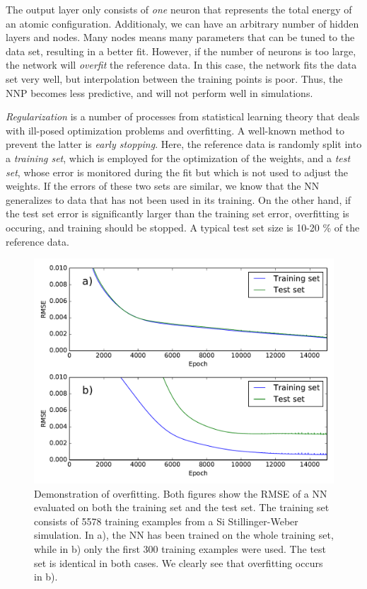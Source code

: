 \documentclass[twoside,english]{uiofysmaster}
\begin{document}
The output layer only consists of \textit{one} neuron that represents the total energy of an atomic 
configuration. Additionaly, we can have an arbitrary number of hidden layers and nodes. 
Many nodes means many parameters that can be tuned to the data set, resulting in a better fit.
However, if the number of neurons is too large, the network will \textit{overfit} the reference data. 
In this case, the network fits the data set very well, but interpolation between the training points is poor. Thus, 
the NNP becomes less predictive, and will not perform well in simulations.

\textit{Regularization} is a number of processes from statistical learning theory that deals with ill-posed optimization
problems and overfitting. A well-known method to prevent the latter is \textit{early stopping}. 
Here, the reference data is randomly split into 
a \textit{training set}, which is employed for the optimization of the weights, and a \textit{test set}, whose error is monitored
during the fit but which is not used to adjust the weights. If the errors of these two sets are similar, we know that the NN
generalizes to data that has not been used in its training. On the other hand, if the test set error is significantly larger
than the training set error, overfitting is occuring, and training should be stopped. 
A typical test set size is 10-20 \% of the reference data. 
\begin{figure}
\centering
  \includegraphics[width = 0.8\linewidth]{Figures/Implementation/overfitting.pdf}
  \caption{Demonstration of overfitting. Both figures show the RMSE of a NN evaluated on both the training set and 
	   the test set. The training set consists of 5578 training examples from a Si Stillinger-Weber simulation.
	   In a), the NN has been trained on 
	   the whole training set, while in b) only the first 300 training examples were used. The test set is 
	   identical in both cases. We clearly see that overfitting occurs in b).}
  \label{fig:overfitting}
\end{figure}
\end{document}

